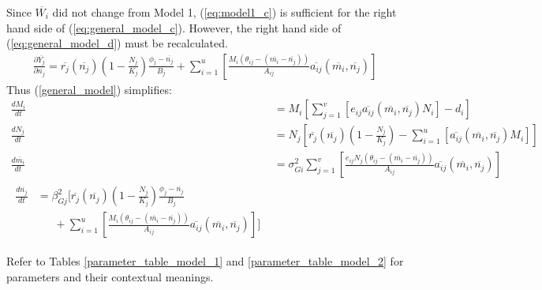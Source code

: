 \documentclass{amsart}
\theoremstyle{definition}
\theoremstyle{remark}
\numberwithin{equation}{section}
\begin{document}
Since $\overline{W_i}$ did not change from Model 1, (\ref{eq:model1_c}) is sufficient for the right hand side of (\ref{eq:general_model_c}).  However, the right hand side of (\ref{eq:general_model_d}) must be recalculated.
\begin{equation}
	\label{model_2_prey_fitness_partial}
	\begin{aligned}
		\frac{\partial \overline{Y_j}}{\partial \overline{n_j}} = \overline{r_j}(\overline{n_j})\left(1 - \frac{N_j}{K_j}\right)\frac{\phi_j - \overline{n_j}}{B_j} + \sum\limits_{i = 1}^{u}\left[\frac{M_i(\theta_{ij} - (\overline{m_i} - \overline{n_j}))}{A_{ij}}\overline{a_{ij}}(\overline{m_i}, \overline{n_j})\right]
	\end{aligned}
\end{equation}
Thus (\ref{general_model}) simplifies:
\begin{subequations}
	\label{model2}
	\begin{align}
		\label{eq:model2_a}
		\frac{dM_i}{dt} &= M_i\left[\sum\limits_{j = 1}^{v}\left[e_{ij}\overline{a_{ij}}(\overline{m_i}, \overline{n_j})N_i\right] - d_i\right] \\[5px]
		\label{eq:model2_b}
		\frac{dN_j}{dt} &= N_j\left[\overline{r_j}(\overline{n_j})\left(1 - \frac{N_j}{K_j}\right) - \sum\limits_{i = 1}^{u}\left[\overline{a_{ij}}(\overline{m_i}, \overline{n_j})M_i\right]\right] \\[5px]
		\label{eq:model2_c}
		\frac{d\overline{m_i}}{dt} &= \sigma_{Gi}^2\sum\limits_{j = 1}^{v}\left[\frac{e_{ij}N_j(\theta_{ij} - (\overline{m_i} - \overline{n_j}))}{A_{ij}}\overline{a_{ij}}(\overline{m_i}, \overline{n_j})\right] \\[5px]
		\label{eq:model2_d}
		\begin{split}
			\frac{d\overline{n_j}}{dt} &= \beta_{Gj}^2\Bigg[\overline{r_j}(\overline{n_j})\left(1 - \frac{N_j}{K_j}\right)\frac{\phi_j - \overline{n_j}}{B_j} \\
			&\ \ \ \ \ \ \ + \sum\limits_{i = 1}^{u}\left[\frac{M_i(\theta_{ij} - (\overline{m_i} - \overline{n_j}))}{A_{ij}}\overline{a_{ij}}(\overline{m_i}, \overline{n_j})\right]\Bigg]
		\end{split}
	\end{align}
\end{subequations}

Refer to Tables \ref{parameter_table_model_1} and \ref{parameter_table_model_2} for parameters and their contextual meanings.
\end{document}
